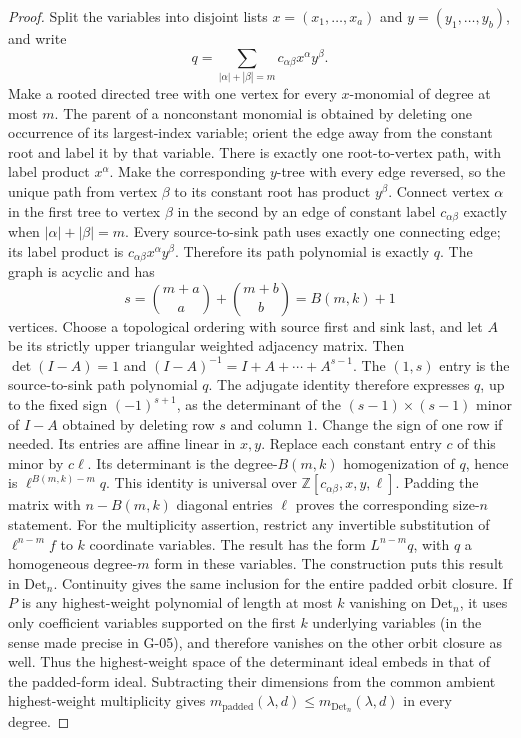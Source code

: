 \begin{proof}
Split the variables into disjoint lists $x=(x_1,\ldots,x_a)$ and $y=(y_1,\ldots,y_b)$, and write
\[
 q=\sum_{|\alpha|+|\beta|=m}c_{\alpha\beta}x^\alpha y^\beta.
\]
Make a rooted directed tree with one vertex for every $x$-monomial of degree at most $m$. The parent of a nonconstant monomial is obtained by deleting one occurrence of its largest-index variable; orient the edge away from the constant root and label it by that variable. There is exactly one root-to-vertex path, with label product $x^\alpha$. Make the corresponding $y$-tree with every edge reversed, so the unique path from vertex $\beta$ to its constant root has product $y^\beta$. Connect vertex $\alpha$ in the first tree to vertex $\beta$ in the second by an edge of constant label $c_{\alpha\beta}$ exactly when $|\alpha|+|\beta|=m$. Every source-to-sink path uses exactly one connecting edge; its label product is $c_{\alpha\beta}x^\alpha y^\beta$. Therefore its path polynomial is exactly $q$. The graph is acyclic and has
\[
 s=\binom{m+a}{a}+\binom{m+b}{b}=B(m,k)+1
\]
vertices.
Choose a topological ordering with source first and sink last, and let $A$ be its strictly upper triangular weighted adjacency matrix. Then $\det(I-A)=1$ and $(I-A)^{-1}=I+A+\cdots+A^{s-1}$. The $(1,s)$ entry is the source-to-sink path polynomial $q$. The adjugate identity therefore expresses $q$, up to the fixed sign $(-1)^{s+1}$, as the determinant of the $(s-1)\times(s-1)$ minor of $I-A$ obtained by deleting row $s$ and column $1$. Change the sign of one row if needed. Its entries are affine linear in $x,y$.
Replace each constant entry $c$ of this minor by $c\ell$. Its determinant is the degree-$B(m,k)$ homogenization of $q$, hence is $\ell^{B(m,k)-m}q$. This identity is universal over $\mathbb Z[c_{\alpha\beta},x,y,\ell]$. Padding the matrix with $n-B(m,k)$ diagonal entries $\ell$ proves the corresponding size-$n$ statement.
For the multiplicity assertion, restrict any invertible substitution of $\ell^{n-m}f$ to $k$ coordinate variables. The result has the form $L^{n-m}q$, with $q$ a homogeneous degree-$m$ form in these variables. The construction puts this result in $\mathrm{Det}_n$. Continuity gives the same inclusion for the entire padded orbit closure. If $P$ is any highest-weight polynomial of length at most $k$ vanishing on $\mathrm{Det}_n$, it uses only coefficient variables supported on the first $k$ underlying variables (in the sense made precise in G-05), and therefore vanishes on the other orbit closure as well. Thus the highest-weight space of the determinant ideal embeds in that of the padded-form ideal. Subtracting their dimensions from the common ambient highest-weight multiplicity gives $m_{\mathrm{padded}}(\lambda,d)\leq m_{\mathrm{Det}_n}(\lambda,d)$ in every degree.
\end{proof}
